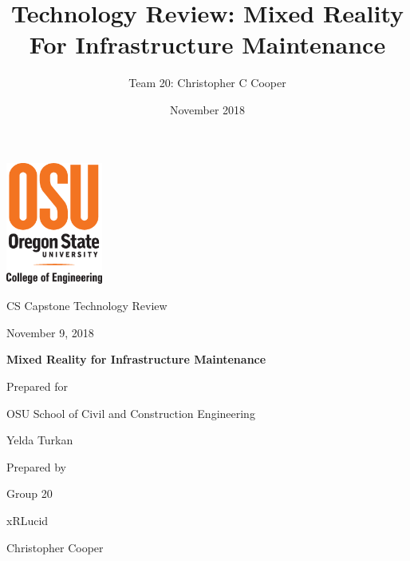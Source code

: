 \documentclass[10pt,draftclsnofoot,onecolumn,letterpaper]{IEEEtran}
\title{Technology Review: Mixed Reality For Infrastructure Maintenance}
\author{Team 20: Christopher C Cooper}
\date{November 2018}
\def \CapstoneTeamName{		xRLucid}
\def \CapstoneTeamNumber{		20}
\def \GroupMemberOne{			Christopher Cooper}
\def \GroupMemberTwo{			Austin Liang}
\def \GroupMemberThree{			David Okubo}
\def \GroupMemberFour{			Jonathan Chen}
\def \GroupMemberFive{			Mingyu Zhang}
\def \CapstoneProjectName{		Mixed Reality for Infrastructure Maintenance}
\def \CapstoneSponsorCompany{	OSU School of Civil and Construction Engineering}
\def \CapstoneSponsorPerson{		Yelda Turkan}
\def \DocType{	%
				Technology Review
				}
\newcommand{\NameSigPair}[1]{\par
\makebox[2.75in][r]{#1} \hfil 	\makebox[3.25in]{\makebox[2.25in]{\hrulefill} \hfill		\makebox[.75in]{\hrulefill}}
\par\vspace{-12pt} \textit{\tiny\noindent
\makebox[2.75in]{} \hfil		\makebox[3.25in]{\makebox[2.25in][r]{Signature} \hfill	\makebox[.75in][r]{Date}}}}
\renewcommand{\NameSigPair}[1]{#1}
\begin{document}
\begin{titlepage}
    \begin{singlespace}
    	\includegraphics[height=4cm]{coe_v_spot1}
        \hfill 
        \par\vspace{.2in}
        \centering
        \scshape{
            \huge CS Capstone \DocType \par
            {\large November 9, 2018}\par
            \vspace{.5in}
            \textbf{\Huge\CapstoneProjectName}\par
            \vfill
            {\large Prepared for}\par
            \Huge \CapstoneSponsorCompany\par
            \vspace{5pt}
            {\Large\NameSigPair{\CapstoneSponsorPerson}\par}
            {\large Prepared by }\par
            Group\CapstoneTeamNumber\par
            \CapstoneTeamName\par 
            \vspace{5pt}
            {\Large
                \NameSigPair{\GroupMemberOne}\par
            }
            \vspace{20pt}
        }


\end{singlespace}
\end{titlepage}
\end{document}
